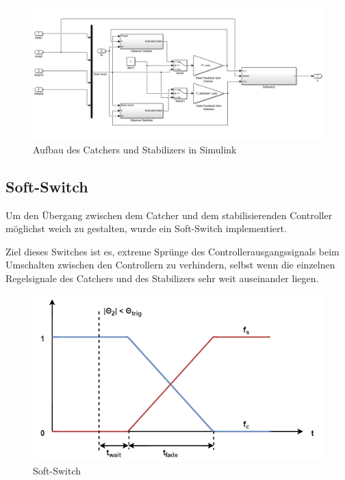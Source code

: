 \begin{figure}[h!]
	\centering	
	\includegraphics[width=1\textwidth]{Grafiken/simulink_top_equilibrium.png}
	\caption{Aufbau des Catchers und Stabilizers in Simulink}
	\label{fig.top_equilibrium}
\end{figure}

\subsection{Soft-Switch}
\label{Softswitch}
Um den Übergang zwischen dem Catcher und dem stabilisierenden Controller möglichst weich zu gestalten, wurde ein Soft-Switch implementiert.

Ziel dieses Switches ist es, extreme Sprünge des Controllerausgangssignals beim Umschalten zwischen den Controllern zu verhindern, selbst wenn die einzelnen Regelsignale des Catchers und des Stabilizers sehr weit auseinander liegen.

\begin{figure}[htbp]
	\centering	
	\includegraphics[width=1\textwidth]{Grafiken/SoftSwitch.png}
	\caption{Soft-Switch}
	\label{fig.Soft-Switch}
\end{figure}

